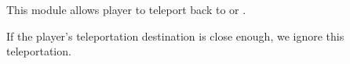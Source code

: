 This module allows player to teleport back to  or .


If the player's teleportation destination is close enough, we ignore this teleportation.



